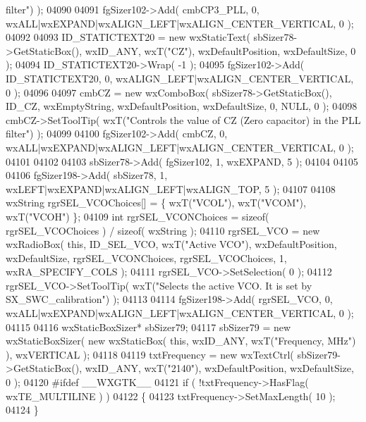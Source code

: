 \begin{DoxyCode}
{       filter"}) );
04090     
04091     fgSizer102->Add( cmbCP3_PLL, 0, wxALL|wxEXPAND|wxALIGN\_LEFT|wxALIGN\_CENTER\_VERTICAL, 0 );
04092     
04093     ID_STATICTEXT20 = \textcolor{keyword}{new} wxStaticText( sbSizer78->GetStaticBox(), wxID\_ANY, wxT(\textcolor{stringliteral}{"CZ"}), wxDefaultPosition, 
      wxDefaultSize, 0 );
04094     ID_STATICTEXT20->Wrap( -1 );
04095     fgSizer102->Add( ID_STATICTEXT20, 0, wxALIGN\_LEFT|wxALIGN\_CENTER\_VERTICAL, 0 );
04096     
04097     cmbCZ = \textcolor{keyword}{new} wxComboBox( sbSizer78->GetStaticBox(), ID_CZ, wxEmptyString, wxDefaultPosition, 
      wxDefaultSize, 0, NULL, 0 ); 
04098     cmbCZ->SetToolTip( wxT(\textcolor{stringliteral}{"Controls the value of CZ (Zero capacitor) in the PLL filter"}) );
04099     
04100     fgSizer102->Add( cmbCZ, 0, wxALL|wxEXPAND|wxALIGN\_LEFT|wxALIGN\_CENTER\_VERTICAL, 0 );
04101     
04102     
04103     sbSizer78->Add( fgSizer102, 1, wxEXPAND, 5 );
04104     
04105     
04106     fgSizer198->Add( sbSizer78, 1, wxLEFT|wxEXPAND|wxALIGN\_LEFT|wxALIGN\_TOP, 5 );
04107     
04108     wxString rgrSEL\_VCOChoices[] = \{ wxT(\textcolor{stringliteral}{"VCOL"}), wxT(\textcolor{stringliteral}{"VCOM"}), wxT(\textcolor{stringliteral}{"VCOH"}) \};
04109     \textcolor{keywordtype}{int} rgrSEL\_VCONChoices = \textcolor{keyword}{sizeof}( rgrSEL\_VCOChoices ) / \textcolor{keyword}{sizeof}( wxString );
04110     rgrSEL_VCO = \textcolor{keyword}{new} wxRadioBox( \textcolor{keyword}{this}, ID_SEL_VCO, wxT(\textcolor{stringliteral}{"Active VCO"}), wxDefaultPosition, wxDefaultSize, 
      rgrSEL\_VCONChoices, rgrSEL\_VCOChoices, 1, wxRA\_SPECIFY\_COLS );
04111     rgrSEL_VCO->SetSelection( 0 );
04112     rgrSEL_VCO->SetToolTip( wxT(\textcolor{stringliteral}{"Selects the active VCO. It is set by SX\_SWC\_calibration"}) );
04113     
04114     fgSizer198->Add( rgrSEL_VCO, 0, wxALL|wxEXPAND|wxALIGN\_LEFT|wxALIGN\_CENTER\_VERTICAL, 0 );
04115     
04116     wxStaticBoxSizer* sbSizer79;
04117     sbSizer79 = \textcolor{keyword}{new} wxStaticBoxSizer( \textcolor{keyword}{new} wxStaticBox( \textcolor{keyword}{this}, wxID\_ANY, wxT(\textcolor{stringliteral}{"Frequency, MHz"}) ), wxVERTICAL 
      );
04118     
04119     txtFrequency = \textcolor{keyword}{new} wxTextCtrl( sbSizer79->GetStaticBox(), wxID\_ANY, wxT(\textcolor{stringliteral}{"2140"}), wxDefaultPosition, 
      wxDefaultSize, 0 );
04120 \textcolor{preprocessor}{    #ifdef \_\_WXGTK\_\_}
04121     \textcolor{keywordflow}{if} ( !txtFrequency->HasFlag( wxTE\_MULTILINE ) )
04122     \{
04123     txtFrequency->SetMaxLength( 10 );
04124     \}

\end{DoxyCode}
